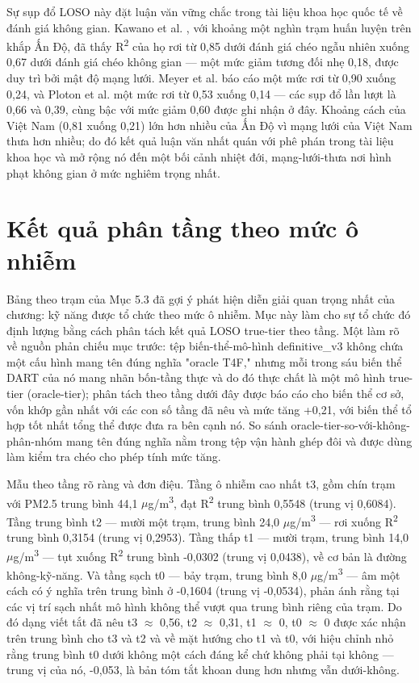Sự sụp đổ LOSO này đặt luận văn vững chắc trong tài liệu khoa học quốc tế về đánh giá không gian. Kawano et al. \cite{kawano2025}, với khoảng một nghìn trạm huấn luyện trên khắp Ấn Độ, đã thấy R\textsuperscript{2} của họ rơi từ 0,85 dưới đánh giá chéo ngẫu nhiên xuống 0,67 dưới đánh giá chéo không gian --- một mức giảm tương đối nhẹ 0,18, được duy trì bởi mật độ mạng lưới. Meyer et al. \cite{meyer2018} báo cáo một mức rơi từ 0,90 xuống 0,24, và Ploton et al. \cite{ploton2020} một mức rơi từ 0,53 xuống 0,14 --- các sụp đổ lần lượt là 0,66 và 0,39, cùng bậc với mức giảm 0,60 được ghi nhận ở đây. Khoảng cách của Việt Nam (0,81 xuống 0,21) lớn hơn nhiều của Ấn Độ vì mạng lưới của Việt Nam thưa hơn nhiều; do đó kết quả luận văn nhất quán với phê phán trong tài liệu khoa học và mở rộng nó đến một bối cảnh nhiệt đới, mạng-lưới-thưa nơi hình phạt không gian ở mức nghiêm trọng nhất.


\section{Kết quả phân tầng theo mức ô nhiễm}

Bảng theo trạm của Mục 5.3 đã gợi ý phát hiện diễn giải quan trọng nhất của chương: kỹ năng được tổ chức theo mức ô nhiễm. Mục này làm cho sự tổ chức đó định lượng bằng cách phân tách kết quả LOSO true-tier theo tầng. Một làm rõ về nguồn phản chiếu mục trước: tệp biến-thể-mô-hình definitive\_v3 không chứa một cấu hình mang tên đúng nghĩa "oracle T4F," nhưng mỗi trong sáu biến thể DART của nó mang nhãn bốn-tầng thực và do đó thực chất là một mô hình true-tier (oracle-tier); phân tách theo tầng dưới đây được báo cáo cho biến thể cơ sở, vốn khớp gần nhất với các con số tầng đã nêu và mức tăng +0,21, với biến thể tổ hợp tốt nhất tổng thể được đưa ra bên cạnh nó. So sánh oracle-tier-so-với-không-phân-nhóm mang tên đúng nghĩa nằm trong tệp vận hành ghép đôi và được dùng làm kiểm tra chéo cho phép tính mức tăng.

Mẫu theo tầng rõ ràng và đơn điệu. Tầng ô nhiễm cao nhất t3, gồm chín trạm với PM2.5 trung bình 44,1 $\mu$g/m\textsuperscript{3}, đạt R\textsuperscript{2} trung bình 0,5548 (trung vị 0,6084). Tầng trung bình t2 --- mười một trạm, trung bình 24,0 $\mu$g/m\textsuperscript{3} --- rơi xuống R\textsuperscript{2} trung bình 0,3154 (trung vị 0,2953). Tầng thấp t1 --- mười trạm, trung bình 14,0 $\mu$g/m\textsuperscript{3} --- tụt xuống R\textsuperscript{2} trung bình -0,0302 (trung vị 0,0438), về cơ bản là đường không-kỹ-năng. Và tầng sạch t0 --- bảy trạm, trung bình 8,0 $\mu$g/m\textsuperscript{3} --- âm một cách có ý nghĩa trên trung bình ở -0,1604 (trung vị -0,0534), phản ánh rằng tại các vị trí sạch nhất mô hình không thể vượt qua trung bình riêng của trạm. Do đó dạng viết tắt đã nêu t3 $\approx$ 0,56, t2 $\approx$ 0,31, t1 $\approx$ 0, t0 $\approx$ 0 được xác nhận trên trung bình cho t3 và t2 và về mặt hướng cho t1 và t0, với hiệu chỉnh nhỏ rằng trung bình t0 dưới không một cách đáng kể chứ không phải tại không --- trung vị của nó, -0,053, là bản tóm tắt khoan dung hơn nhưng vẫn dưới-không.

